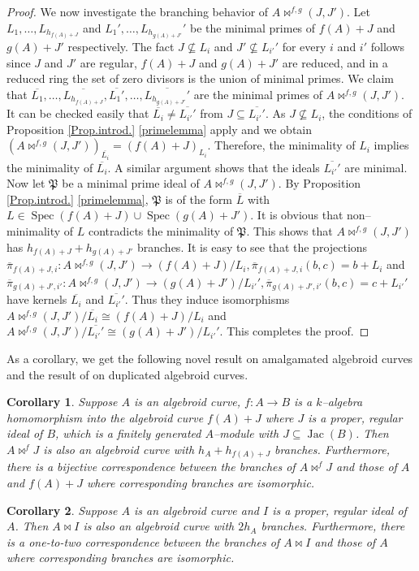 \documentclass{amsart}%
\theoremstyle{plain}
\newtheorem{corollary}{Corollary}[section]
\numberwithin{equation}{section}
\theoremstyle{definition}
\DeclareMathOperator{\jac}{Jac}
\DeclareMathOperator{\spec}{Spec}
\begin{document}
\begin{proof}
    We now investigate the branching behavior of $A\bowtie^{f,g}(J,J')$. Let $L_1,\ldots,L_{h_{f(A)+J}}$ and $L_1',\ldots,L_{h_{g(A)+J'}}'$ be the minimal primes of $f(A)+J$ and $g(A)+J'$ respectively. The fact $J\nsubseteq L_i$ and $J'\nsubseteq L_{i'}'$ for every $i$ and $i'$ follows since $J$ and $J'$ are regular, $f(A)+J$ and $g(A)+J'$ are reduced, and in a reduced ring the set of zero divisors is the union of minimal primes. We claim that $\overline{L_1},\ldots,\overline{L_{h_{f(A)+J}}},\overline{L_1'},\ldots,\overline{L_{h_{g(A)+J'}}'}$ are the minimal primes of $A\bowtie^{f,g}(J,J')$. It can be checked easily that $\overline{L_i}\neq \overline{L_{i'}'}$ from $J\subseteq \overline{L_{i'}'}$. As $J\nsubseteq L_i$, the conditions of Proposition \ref{Prop.introd.} \ref{primelemma} apply and we obtain $\left(A\bowtie^{f,g}(J,J')\right)_{\overline{L_i}}=(f(A)+J)_{L_i}$. Therefore, the minimality of $L_i$ implies the minimality of $\overline{L_i}$. A similar argument shows that the ideals $\overline{L_{i'}'}$ are minimal. Now let $\mathfrak{P}$ be a minimal prime ideal of $A\bowtie^{f,g}(J,J')$. By Proposition \ref{Prop.introd.} \ref{primelemma}, $\mathfrak{P}$ is of the form $\overline{L}$ with $L\in \spec(f(A)+J)\cup\spec(g(A)+J')$. It is obvious that non--minimality of $L$ contradicts the minimality of $\mathfrak{P}$. This shows that $A\bowtie^{f,g}(J,J')$ has $h_{f(A)+J}+h_{g(A)+J'}$ branches. It is easy to see that the projections $\overline{\pi}_{f(A)+J,i}:A\bowtie^{f,g}(J,J')\to (f(A)+J)/L_i, \overline{\pi}_{f(A)+J,i}(b,c)=b+L_i$ and $\overline{\pi}_{g(A)+J',i'}:A\bowtie^{f,g}(J,J')\to (g(A)+J')/L_{i'}', \overline{\pi}_{g(A)+J',i'}(b,c)=c+L_{i'}'$ have kernels $\overline{L_i}$ and $\overline{L_{i'}'}$. Thus they induce isomorphisms $A\bowtie^{f,g}(J,J')/\overline{L_i}\cong (f(A)+J)/L_i$ and $A\bowtie^{f,g}(J,J')/\overline{L_{i'}'}\cong (g(A)+J')/L_{i'}'$. This completes the proof.
\end{proof}

As a corollary, we get the following novel result on amalgamated algebroid curves and the result of \cite{Gorenstein} on duplicated algebroid curves.

\begin{corollary}
    Suppose $A$ is an algebroid curve, $f:A\to B$ is a $k$--algebra homomorphism into the algebroid curve $f(A)+J$ where $J$ is a proper, regular ideal of $B$, which is a finitely generated $A$--module with $J\subseteq \jac(B)$. Then $A\bowtie^{f}J$ is also an algebroid curve with $h_A+h_{f(A)+J}$ branches. Furthermore, there is a bijective correspondence between the branches of $A\bowtie^{f}J$ and those of $A$ and $f(A)+J$ where corresponding branches are isomorphic.
\end{corollary}
\begin{corollary}
    Suppose $A$ is an algebroid curve and $I$ is a proper, regular ideal of $A$. Then $A\bowtie I$ is also an algebroid curve with $2h_A$ branches. Furthermore, there is a one-to-two correspondence between the branches of $A\bowtie I$ and those of $A$ where corresponding branches are isomorphic. 
\end{corollary}
\end{document}
